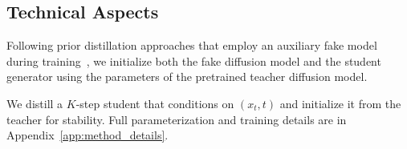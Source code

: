 \vspace{-1mm}
\subsection{Technical Aspects}
\label{sec:technical aspects}
\vspace{-3mm}
    Following prior distillation approaches that employ an auxiliary fake model during training~\citep{yin2024one, yin2024improved, zhou2024score, zhou2024adversarial, gushchin2025inverse, kornilov2025universal}, we initialize both the fake diffusion model and the student generator using the parameters of the pretrained teacher diffusion model.

    We distill a \(K\)-step student that conditions on \((x_t,t)\) and initialize it from the teacher for stability. Full parameterization and training details are in Appendix~\ref{app:method_details}.



